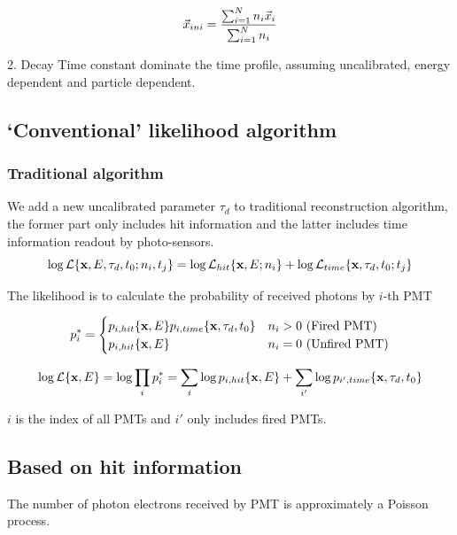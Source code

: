 \documentclass{article}
\begin{document}
    \begin{equation}
        \numberwithin{equation}{section}
        \vec{x}_{ini} = \frac{\sum_{i=1}^N n_i\vec{x}_i}{\sum_{i=1}^N n_i}
    \end{equation}

2. Decay Time constant dominate the time profile, assuming uncalibrated, energy dependent and particle dependent.

\subsection{`Conventional' likelihood algorithm}
	
\subsubsection{Traditional algorithm}

	We add a new uncalibrated parameter $\tau_d$ to traditional reconstruction algorithm, the former part only includes hit information and the latter includes time information readout by photo-sensors.
	\begin{equation}
		\numberwithin{equation}{section}
		\log \mathcal{L}\{\textbf{x},E,\tau_d, t_0;n_i,t_j\} = \log \mathcal{L}_{hit}\{\textbf{x},E;n_i\}+\log \mathcal{L}_{time}\{\textbf{x},\tau_d, t_0;t_j\}
	\end{equation}
	
	The likelihood is to calculate the probability of received photons by $i$-th PMT 

	\begin{equation}
	\numberwithin{equation}{section}
	p^*_i =  
		\begin{cases}
 		p_{i,hit}\{${\textbf x}$,E\} p_{i, time}\{${\textbf x}$, \tau_d, t_0\}& \text{$n_i > 0$ (Fired PMT)}\\
 		p_{i,hit}\{${\textbf x}$,E\} & \text{$n_i=0$ (Unfired PMT)}
		\end{cases}
	\end{equation}
	
	\begin{equation}
		\numberwithin{equation}{section}
		\log \mathcal{L}\{\textbf{x},E\} = \log \prod_{i} p^*_i = 	\sum_{i}\log p_{i,hit}\{\textbf{x},E\} +\sum_{i'}\log p_{i',time}\{\textbf{x},\tau_d, t_0\} 
	\end{equation}
	
	$i$ is the index of all PMTs and $i'$ only includes fired PMTs.   
\subsection{Based on hit information}
	\par The number of photon electrons received by PMT is approximately a Poisson process.
	
\end{document}
